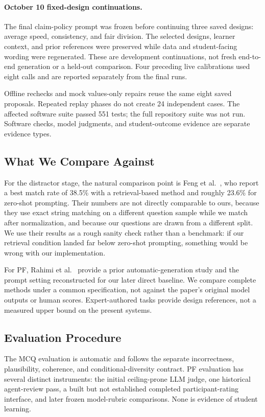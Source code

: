 \paragraph{October 10 fixed-design continuations.} The final claim-policy prompt was frozen before continuing three saved designs: average speed, consistency, and fair division. The selected designs, learner context, and prior references were preserved while data and student-facing wording were regenerated. These are development continuations, not fresh end-to-end generation or a held-out comparison. Four preceding live calibrations used eight calls and are reported separately from the final runs.

Offline rechecks and mock values-only repairs reuse the same eight saved proposals. Repeated replay phases do not create 24 independent cases. The affected software suite passed 551 tests; the full repository suite was not run. Software checks, model judgments, and student-outcome evidence are separate evidence types.

\subsection{What We Compare Against}

For the distractor stage, the natural comparison point is Feng et al.~\cite{feng2024}, who report a best match rate of 38.5\% with a retrieval-based method and roughly 23.6\% for zero-shot prompting. Their numbers are not directly comparable to ours, because they use exact string matching on a different question sample while we match after normalization, and because our questions are drawn from a different split. We use their results as a rough sanity check rather than a benchmark: if our retrieval condition landed far below zero-shot prompting, something would be wrong with our implementation.

For PF, Rahimi et al.~\cite{rahimi2025} provide a prior automatic-generation study and the prompt setting reconstructed for our later direct baseline. We compare complete methods under a common specification, not against the paper's original model outputs or human scores. Expert-authored tasks provide design references, not a measured upper bound on the present systems.

\subsection{Evaluation Procedure}

The MCQ evaluation is automatic and follows the separate incorrectness, plausibility, coherence, and conditional-diversity contract. PF evaluation has several distinct instruments: the initial ceiling-prone LLM judge, one historical agent-review pass, a built but not established completed participant-rating interface, and later frozen model-rubric comparisons. None is evidence of student learning.

